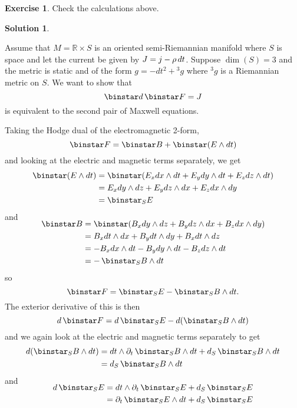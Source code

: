 \documentclass[11pt, a4paper]{report}
\theoremstyle{definition}
\newtheorem{exercise}{Exercise}[part]
\newtheorem{solution}{Solution}[part]
\newenvironment{ex}{\begin{exercise}}{\end{exercise}\pagebreak[1]}
\newenvironment{sol}{\begin{solution}}{\end{solution}\pagebreak[3]}
\newcommand*{\op}[1]{\ensuremath\mathop{}\mathopen{}#1}
\renewcommand*{\d}{\op{d}}
\renewcommand*{\star}{\op{\binstar}\mathord{}}
\begin{document}
\begin{ex}

Check the calculations above.

\end{ex}

\begin{sol}\label{sol:secondpair}

Assume that $M = \mathbb{R} \times S$ is an oriented semi-Riemannian manifold where $S$ is space and let the current be given by $J = j - \rho \d t$. Suppose $\dim(S) = 3$ and the metric is static and of the form $g = -dt^2 + {^3 g}$ where $^3 g$ is a Riemannian metric on $S$. We want to show that
\[
    \star d \star F = J
\]
is equivalent to the second pair of Maxwell equations.

Taking the Hodge dual of the electromagnetic 2-form,
\[
    \star F = \star B + \star (E \wedge dt)
\]
and looking at the electric and magnetic terms separately, we get
\begin{align*}
    \star (E \wedge dt) &= \star (E_x dx \wedge dt + E_y dy \wedge dt + E_z dz \wedge dt) \\
        &= E_x dy \wedge dz + E_y dz \wedge dx + E_z dx \wedge dy \\
        &= \star_S E
\end{align*}
and
\begin{align*}
    \SwapAboveDisplaySkip
    \star B &= \star (B_x dy \wedge dz + B_y dz \wedge dx + B_z dx \wedge dy) \\
            &= B_x dt \wedge dx + B_y dt \wedge dy + B_x dt \wedge dz \\
            &= - B_x dx \wedge dt - B_y dy \wedge dt - B_z dz \wedge dt \\
            &= - \star_S B \wedge dt
\end{align*}
so
\[
    \star F = \star_S E - \star_S B \wedge dt.
\]
The exterior derivative of this is then
\[
    d \star F = d \star_S E - d (\star_S B \wedge dt)
\]
and we again look at the electric and magnetic terms separately to get
\begin{align*}
     d (\star_S B \wedge dt) &= dt \wedge \partial_t \star_S B \wedge dt + d_S \star_S B \wedge dt \\
                             &= d_S \star_S B \wedge dt
\end{align*}
and
\begin{align*}
    \SwapAboveDisplaySkip
    d \star_S E &= dt \wedge \partial_t \star_S E + d_S \star_S E \\
        &= \partial_t \star_S E \wedge dt + d_S \star_S E \\

\end{align*}
\end{sol}
\end{document}

